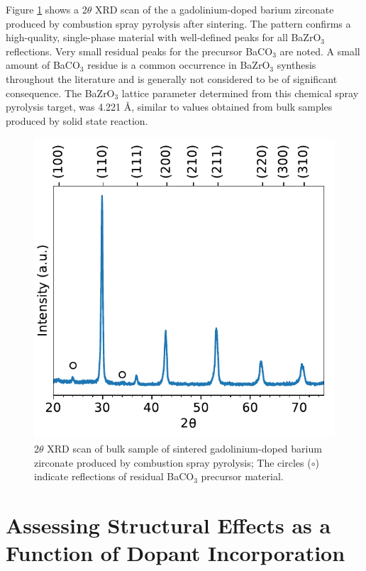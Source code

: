 Figure \ref{fig:target:xrd:praxbzg} shows a 2$\theta$ XRD scan of the a gadolinium-doped barium zirconate produced by combustion spray pyrolysis after sintering. The pattern confirms a high-quality, single-phase material with well-defined peaks for all BaZrO$_3$ reflections. Very small residual peaks for the precursor BaCO$_3$ are noted. A small amount of BaCO$_3$ residue is a common occurrence in BaZrO$_3$ synthesis throughout the literature and is generally not considered to be of significant consequence. The BaZrO$_3$ lattice parameter determined from this chemical spray pyrolysis target, was 4.221 \AA, similar to values obtained from bulk samples produced by solid state reaction.  
\begin{figure}
    \centering
    \includegraphics{Figures/181115-xrd-PraxBZG-pellet.pdf}
    \caption{2$\theta$ XRD scan of bulk sample of sintered gadolinium-doped barium zirconate produced by combustion spray pyrolysis; The circles ($\circ$) indicate reflections of residual BaCO$_3$ precursor material.}
    \label{fig:target:xrd:praxbzg}
\end{figure}

\vspace{12pt}
\section{Assessing Structural Effects as a Function of Dopant Incorporation}

